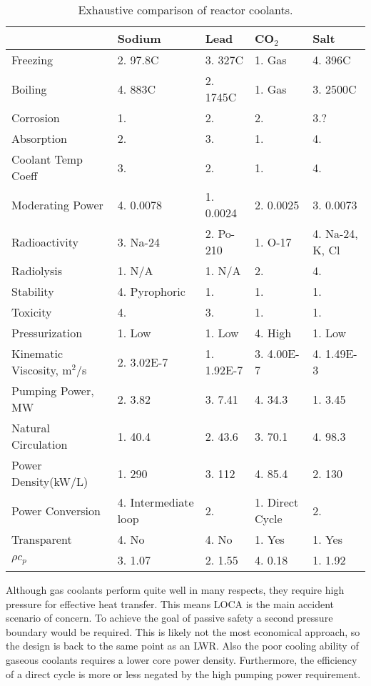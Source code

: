 \documentclass[]{report}
\begin{document}
\begin{table}[ht]
\begin{tabular}{l|l|l|l|l}
          & Sodium & Lead & CO$_2$ & Salt\\
  \hline
  Freezing & 2. 97.8C & 3. 327C & 1. Gas & 4. 396C\\ 
  Boiling & 4. 883C & 2. 1745C & 1. Gas & 3. 2500C\\ 
  Corrosion & 1. & 2. & 2. & 3.? \\
  Absorption & 2. & 3. & 1. & 4. \\
  Coolant Temp Coeff & 3. & 2. & 1. & 4.\\
  Moderating Power & 4. 0.0078 & 1. 0.0024 & 2. 0.0025 & 3. 0.0073\\
  Radioactivity & 3. Na-24 & 2. Po-210 & 1. O-17 & 4. Na-24, K, Cl \\
  Radiolysis & 1. N/A & 1. N/A & 2. & 4. \\
  Stability & 4. Pyrophoric & 1. & 1. & 1. \\
  Toxicity & 4. & 3. & 1. & 1. \\
  Pressurization & 1. Low & 1. Low & 4. High & 1. Low \\
  Kinematic Viscosity, m$^2$/s & 2. 3.02E-7 & 1. 1.92E-7 & 3. 4.00E-7 & 4. 1.49E-3 \\ 
  Pumping Power, MW \cite{coolant_comparison} & 2. 3.82 & 3. 7.41 & 4. 34.3 & 1. 3.45 \\
  Natural Circulation \cite{coolant_comparison} & 1. 40.4 & 2. 43.6 & 3. 70.1 & 4. 98.3 \\
  Power Density(kW/L) & 1. 290 & 3. 112  & 4. 85.4 & 2. 130 \\
  Power Conversion & 4. Intermediate loop & 2. & 1. Direct Cycle & 2. \\
  Transparent & 4. No & 4. No & 1. Yes & 1. Yes\\
  $\rho c_p$ & 3. 1.07 & 2. 1.55 & 4. 0.18 & 1. 1.92\\   %
  \hline
\end{tabular}
\caption{Exhaustive comparison of reactor coolants.\cite{coolant_comparison}}
\end{table}

Although gas coolants perform quite well in many respects, they require high pressure for effective heat transfer. This means LOCA is the main accident scenario of concern. To achieve the goal of passive safety a second pressure boundary would be required. 
This is likely not the most economical approach, so the design is back to the same point as an LWR. Also the poor cooling ability of gaseous coolants requires a lower core power density.
Furthermore, the efficiency of a direct cycle is more or less negated by the high pumping power requirement.
\end{document}
